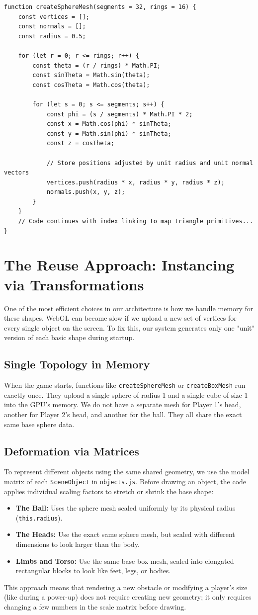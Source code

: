 \begin{lstlisting}[style=vscode_JS]
function createSphereMesh(segments = 32, rings = 16) {
    const vertices = [];
    const normals = [];
    const radius = 0.5;

    for (let r = 0; r <= rings; r++) {
        const theta = (r / rings) * Math.PI;
        const sinTheta = Math.sin(theta);
        const cosTheta = Math.cos(theta);

        for (let s = 0; s <= segments; s++) {
            const phi = (s / segments) * Math.PI * 2;
            const x = Math.cos(phi) * sinTheta;
            const y = Math.sin(phi) * sinTheta;
            const z = cosTheta;

            // Store positions adjusted by unit radius and unit normal vectors
            vertices.push(radius * x, radius * y, radius * z);
            normals.push(x, y, z);
        }
    }
    // Code continues with index linking to map triangle primitives...
}
\end{lstlisting}

\section{The Reuse Approach: Instancing via Transformations}
One of the most efficient choices in our architecture is how we handle memory for these shapes. WebGL can become slow if we upload a new set of vertices for every single object on the screen. To fix this, our system generates only one "unit" version of each basic shape during startup.

\subsection{Single Topology in Memory}
When the game starts, functions like \texttt{createSphereMesh} or \texttt{createBoxMesh} run exactly once. They upload a single sphere of radius 1 and a single cube of size 1 into the GPU's memory. We do not have a separate mesh for Player 1's head, another for Player 2's head, and another for the ball. They all share the exact same base sphere data.

\subsection{Deformation via Matrices}
To represent different objects using the same shared geometry, we use the model matrix of each \texttt{SceneObject} in \texttt{objects.js}. Before drawing an object, the code applies individual scaling factors to stretch or shrink the base shape:
\begin{itemize}
    \item \textbf{The Ball:} Uses the sphere mesh scaled uniformly by its physical radius (\texttt{this.radius}).
    \item \textbf{The Heads:} Use the exact same sphere mesh, but scaled with different dimensions to look larger than the body.
    \item \textbf{Limbs and Torso:} Use the same base box mesh, scaled into elongated rectangular blocks to look like feet, legs, or bodies.
\end{itemize}

This approach means that rendering a new obstacle or modifying a player's size (like during a power-up) does not require creating new geometry; it only requires changing a few numbers in the scale matrix before drawing.